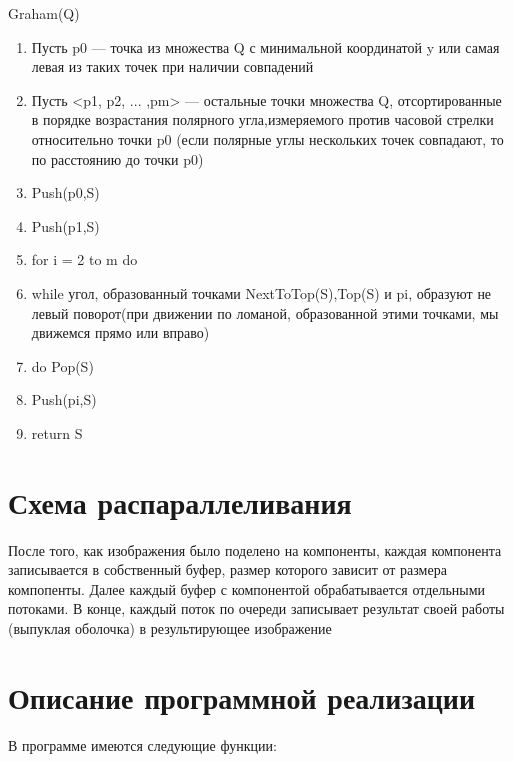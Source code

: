 \documentclass{report}
\begin{document}
Graham(Q)
\begin{enumerate}
	\item Пусть p0 — точка из множества Q с минимальной координатой y или самая левая из таких точек при наличии совпадений
	\item Пусть <p1, p2, ... ,pm> — остальные точки множества Q, отсортированные в порядке возрастания полярного угла,измеряемого против часовой стрелки относительно точки p0 (если полярные углы нескольких точек совпадают, то по расстоянию до точки p0)
	\item Push(p0,S)
	\item Push(p1,S)
	\item for i = 2 to m do
	\item   while угол, образованный точками NextToTop(S),Top(S) и pi, образуют не левый поворот(при движении по ломаной, образованной этими точками, мы движемся прямо или вправо)
	\item      do Pop(S)
	\item    Push(pi,S)
	\item return S
\end{enumerate}

\newpage

\section*{Схема распараллеливания}
После того, как изображения было поделено на компоненты, каждая компонента записывается в собственный буфер, размер которого зависит от размера компопенты. Далее каждый буфер с компонентой обрабатывается отдельными потоками. В конце, каждый поток по очереди записывает результат своей работы (выпуклая оболочка) в результирующее изображение
\newpage

\section*{Описание программной реализации}
В программе имеются следующие функции:
\end{document}
